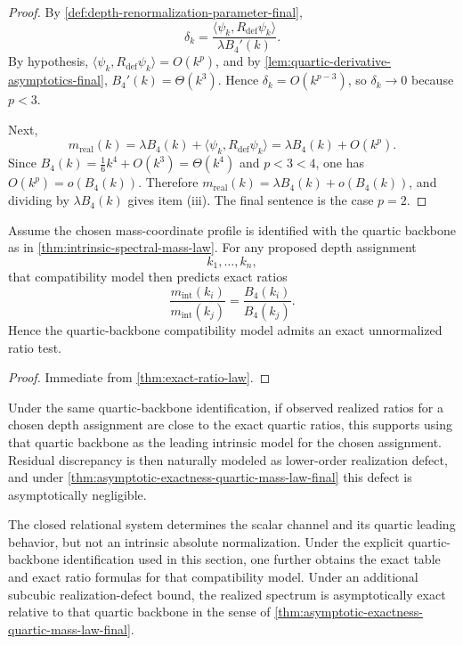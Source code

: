 \begin{proof}
By
\cref{def:depth-renormalization-parameter-final},
\[
  \delta_k
  =
  \frac{\langle \psi_k,R_{\mathrm{def}}\psi_k\rangle}{\lambda B_4'(k)}.
\]
By hypothesis,
\(
\langle \psi_k,R_{\mathrm{def}}\psi_k\rangle = O(k^p)
\), and by
\cref{lem:quartic-derivative-asymptotics-final},
\(
B_4'(k)=\Theta(k^3)
\).
Hence
\(
\delta_k = O(k^{p-3})
\), so \(\delta_k\to0\) because \(p<3\).

Next,
\[
  m_{\mathrm{real}}(k)
  =
  \lambda B_4(k)+\langle \psi_k,R_{\mathrm{def}}\psi_k\rangle
  =
  \lambda B_4(k)+O(k^p).
\]
Since
\(
B_4(k)=\frac16k^4+O(k^3)=\Theta(k^4)
\)
and \(p<3<4\), one has
\(
O(k^p)=o(B_4(k))
\).
Therefore
\(
m_{\mathrm{real}}(k)=\lambda B_4(k)+o(B_4(k))
\), and dividing by \(\lambda B_4(k)\) gives item \textup{(iii)}.
The final sentence is the case \(p=2\).
\end{proof}

\begin{proposition}
\label{prop:exact-ratio-test}
Assume the chosen mass-coordinate profile is identified with the
quartic backbone as in \cref{thm:intrinsic-spectral-mass-law}.
For any proposed depth assignment
\[
  k_1,\dots,k_n,
\]
that compatibility model then predicts exact ratios
\[
  \frac{m_{\mathrm{int}}(k_i)}{m_{\mathrm{int}}(k_j)}
  =
  \frac{B_4(k_i)}{B_4(k_j)}.
\]
Hence the quartic-backbone compatibility model admits an exact
unnormalized ratio test.
\end{proposition}

\begin{proof}
Immediate from \cref{thm:exact-ratio-law}.
\end{proof}

\begin{remark}
\label{rem:exact-ratio-interpretive-consequence}
Under the same quartic-backbone identification, if observed realized
ratios for a chosen depth assignment are close to the exact quartic
ratios, this supports using that quartic backbone as the leading
intrinsic model for the chosen assignment.
Residual discrepancy is then naturally modeled as lower-order realization
defect, and under
\cref{thm:asymptotic-exactness-quartic-mass-law-final} this defect is
asymptotically negligible.
\end{remark}

\begin{theorem}
\label{thm:complete-intrinsic-spectral-prediction}
The closed relational system determines the scalar channel and its
quartic leading behavior, but not an intrinsic absolute normalization.
Under the explicit quartic-backbone identification used in this
section, one further obtains the exact table and exact ratio formulas
for that compatibility model.
Under an additional subcubic realization-defect bound, the realized
spectrum is asymptotically exact relative to that quartic backbone in
the sense of
\cref{thm:asymptotic-exactness-quartic-mass-law-final}.
\end{theorem}

